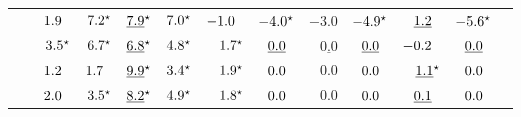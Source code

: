 \begin{tabular}{@{}llrrrrrrrrrrr@{}}
& \diffp{\ndcg} & $1.9\hspace{0.6em}$ & $7.2^{\star}$ & $\underline{7.9}^{\star}$ & $7.0^{\star}$ & $-1.0\hspace{0.6em}$ & $-4.0^{\star}$ & $-3.0$ & $-4.9^{\star}$ & $\underline{1.2}\hspace{0.6em}$ & $-5.6^{\star}$\\
\addlinespace
\multirow{3}{*}{\interp } & \diffp{\map} & $3.5^{\star}$ & $6.7^{\star}$ & $\underline{6.8}^{\star}$ & $4.8^{\star}$ & $1.7^{\star}$ & $\underline{0.0}\hspace{0.6em}$ & $\underline{0.0}$ & $\underline{0.0}\hspace{0.6em}$ & $-0.2\hspace{0.6em}$ & $\underline{0.0}\hspace{0.6em}$\\
& \diffp{\precFive} & $1.2\hspace{0.6em}$ & $1.7\hspace{0.6em}$ & $\underline{9.9}^{\star}$ & $3.4^{\star}$ & $1.9^{\star}$ & $0.0\hspace{0.6em}$ & $0.0$ & $0.0\hspace{0.6em}$ & $\underline{1.1}^{\star}$ & $0.0\hspace{0.6em}$\\
& \diffp{\ndcg} & $2.0\hspace{0.6em}$ & $3.5^{\star}$ & $\underline{8.2}^{\star}$ & $4.9^{\star}$ & $1.8^{\star}$ & $0.0\hspace{0.6em}$ & $0.0$ & $0.0\hspace{0.6em}$ & $\underline{0.1}\hspace{0.6em}$ & $0.0\hspace{0.6em}$\\

\end{tabular}
